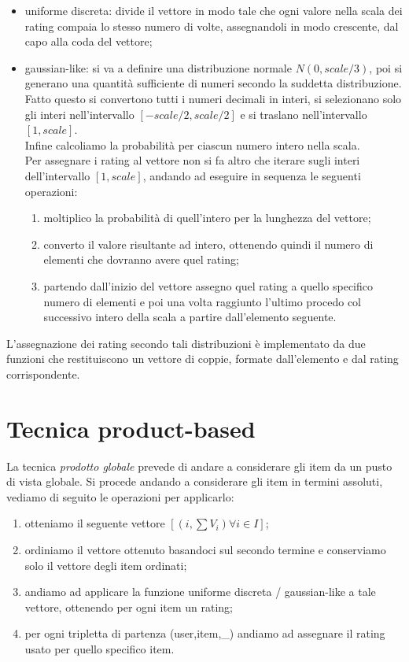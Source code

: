 \begin{itemize}
    \item uniforme discreta: divide il vettore in modo tale che ogni valore nella scala dei rating compaia lo stesso numero di volte, assegnandoli in modo crescente, dal capo alla coda del vettore;
    \item gaussian-like: si va a definire una distribuzione normale $N(0,scale/3)$, poi si generano una quantità sufficiente di numeri secondo la suddetta distribuzione. Fatto questo si convertono tutti i numeri decimali in interi, si selezionano solo gli interi nell'intervallo $[-scale/2,scale/2]$ e si traslano nell'intervallo $[1,scale]$.\\
    Infine calcoliamo la probabilità per ciascun numero intero nella scala.\\
    Per assegnare i rating al vettore non si fa altro che iterare sugli interi dell'intervallo $[1,scale]$, andando ad eseguire in sequenza le seguenti operazioni:
    \begin{enumerate}
        \item moltiplico la probabilità di quell'intero per la lunghezza del vettore;
        \item converto il valore risultante ad intero, ottenendo quindi il numero di elementi che dovranno avere quel rating;
        \item partendo dall'inizio del vettore assegno quel rating a quello specifico numero di elementi e poi una volta raggiunto l'ultimo procedo col successivo intero della scala a partire dall'elemento seguente.
    \end{enumerate}
\end{itemize}
L'assegnazione dei rating secondo tali distribuzioni è implementato da due funzioni che restituiscono un vettore di coppie, formate dall'elemento e dal rating corrispondente.

\section{Tecnica product-based}
La tecnica \textit{prodotto globale} prevede di andare a considerare gli item da un pusto di vista globale. Si procede andando a considerare gli item in termini assoluti, vediamo di seguito le operazioni per applicarlo:
\begin{enumerate}
    \item otteniamo il seguente vettore $[(i,\sum V_i) \forall i \in I]$;
    \item ordiniamo il vettore ottenuto basandoci sul secondo termine e conserviamo solo il vettore degli item ordinati;
    \item andiamo ad applicare la funzione uniforme discreta / gaussian-like a tale vettore, ottenendo per ogni item un rating;
    \item per ogni tripletta di partenza (user,item,\_) andiamo ad assegnare il rating usato per quello specifico item. 
\end{enumerate}

